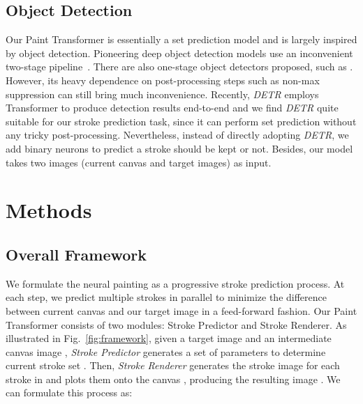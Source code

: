 \documentclass[10pt,twocolumn,letterpaper]{article}
\begin{document}
\subsection{Object Detection}
Our Paint Transformer is essentially a set prediction model and is largely inspired by object detection. 
Pioneering deep object detection models use an inconvenient two-stage pipeline~\cite{ren2015faster}. There are also one-stage object detectors proposed, such as \cite{yolo,redmon2016look,tian2019fcos}.
However, its heavy dependence on post-processing steps such as non-max suppression can still bring much inconvenience. 
Recently, \textit{DETR} \cite{carion2020endtoend} employs Transformer \cite{vaswani2017attention} to produce detection results end-to-end and we find \textit{DETR} quite suitable for our stroke prediction task, since it can perform set prediction without any tricky post-processing. Nevertheless, instead of directly adopting \textit{DETR}, we add binary neurons to predict a stroke should be kept or not. Besides, our model takes two images (current canvas and target images) as input.  




\section{Methods}





\subsection{Overall Framework}

We formulate the neural painting as a progressive stroke prediction process. At each step, we predict multiple strokes in parallel to minimize the difference between current canvas and our target image in a feed-forward fashion.
Our Paint Transformer consists of two modules: Stroke Predictor and Stroke Renderer.
As illustrated in Fig.~\ref{fig:framework},
given a target image  and an intermediate canvas image , \emph{Stroke Predictor} generates a set of parameters to determine current stroke set .
Then, \emph{Stroke Renderer} generates the stroke image for each stroke in  and plots them onto the canvas , producing the resulting image . We can formulate this process as:
\end{document}
